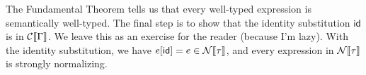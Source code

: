 \documentclass{article}
\theoremstyle{definition}
\begin{document}
The Fundamental Theorem tells us that every well-typed expression is semantically well-typed.
The final step is to show that the identity substitution $\mathsf{id}$ is in $\mathcal{C}\llbracket\Gamma\rrbracket$.
We leave this as an exercise for the reader (because I'm lazy).
With the identity substitution, we have $e[\mathsf{id}] = e \in \mathcal{N}\llbracket\tau\rrbracket$, and every expression in $\mathcal{N}\llbracket\tau\rrbracket$ is strongly normalizing.
\end{document}
